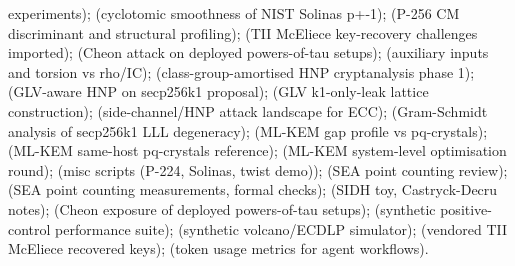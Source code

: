 experiments);  (cyclotomic smoothness of NIST Solinas p+-1);  (P-256 CM discriminant and structural profiling);  (TII McEliece key-recovery challenges imported);  (Cheon attack on deployed powers-of-tau setups);  (auxiliary inputs and torsion vs rho/\allowbreak{}IC);  (class-group-amortised HNP cryptanalysis phase 1);  (GLV-aware HNP on secp256k1 proposal);  (GLV k1-only-leak lattice construction);  (side-channel/\allowbreak{}HNP attack landscape for ECC);  (Gram-Schmidt analysis of secp256k1 LLL degeneracy);  (ML-KEM gap profile vs pq-crystals);  (ML-KEM same-host pq-crystals reference);  (ML-KEM system-level optimisation round);  (misc scripts (P-224, Solinas, twist demo));  (SEA point counting review);  (SEA point counting measurements, formal checks);  (SIDH toy, Castryck-Decru notes);  (Cheon exposure of deployed powers-of-tau setups);  (synthetic positive-control performance suite);  (synthetic volcano/\allowbreak{}ECDLP simulator);  (vendored TII McEliece recovered keys);  (token usage metrics for agent workflows).

